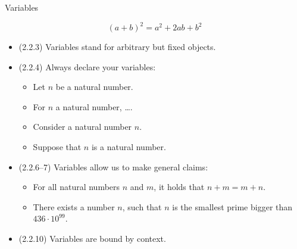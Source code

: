 \begin{frame}{Variables}

	\[(a+b)^2=a^2+2ab+b^2\]
	
	\begin{itemize}
	
		\item (2.2.3) Variables stand for arbitrary but fixed objects.
		
		\item (2.2.4) Always declare your variables:
		
			\begin{itemize} 
			
				\item Let $n$ be a natural number. 
							
				\item For $n$ a natural number, \dots.
				
				\item Consider a natural number $n$.
				
				\item Suppose that $n$ is a natural number. 
			
			\end{itemize}
		
		\item (2.2.6--7) Variables allow us to make general claims:
		
			\begin{itemize}
			
				\item For all natural numbers $n$ and $m$, it holds that $n+m=m+n$.
				
				\item There exists a number $n$, such that $n$ is the smallest prime bigger than $436\cdot 10^99$.
			
			\end{itemize}
			
		\item (2.2.10) Variables are bound by context.
	
	\end{itemize}

\end{frame}

